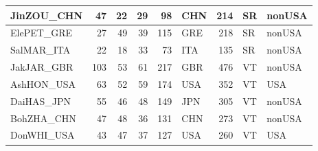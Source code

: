 \documentclass[
  letterpaper,
  DIV=11,
  numbers=noendperiod]{scrartcl}
\begin{document}
\begin{tabular}{l|r|r|r|r|l|r|l|l}
\hline
JinZOU\_CHN & 47 & 22 & 29 & 98 & CHN & 214 & SR & nonUSA\\
\hline
ElePET\_GRE & 27 & 49 & 39 & 115 & GRE & 218 & SR & nonUSA\\
\hline
SalMAR\_ITA & 22 & 18 & 33 & 73 & ITA & 135 & SR & nonUSA\\
\hline
JakJAR\_GBR & 103 & 53 & 61 & 217 & GBR & 476 & VT & nonUSA\\
\hline
AshHON\_USA & 63 & 52 & 59 & 174 & USA & 352 & VT & USA\\
\hline
DaiHAS\_JPN & 55 & 46 & 48 & 149 & JPN & 305 & VT & nonUSA\\
\hline
BohZHA\_CHN & 47 & 48 & 36 & 131 & CHN & 273 & VT & nonUSA\\
\hline
DonWHI\_USA & 43 & 47 & 37 & 127 & USA & 260 & VT & USA\\
\hline
\end{tabular}
\end{document}
